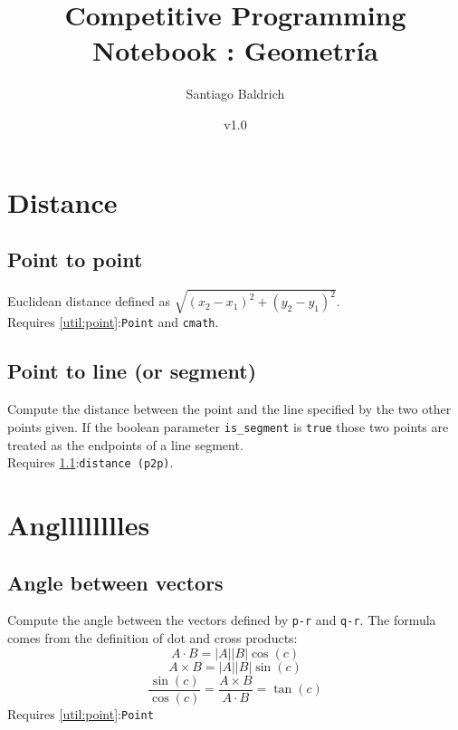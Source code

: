 \documentclass[11pt, oneside]{article}   	%
\title{Competitive Programming Notebook : Geometr\'ia}
\author{Santiago Baldrich}
\date{v1.0}
\begin{document}
\maketitle
\newpage
\tableofcontents






\section{Distance}
\subsection{Point to point}\label{distance:p2p}
	Euclidean distance defined as $\sqrt{(x_2 - x_1)^2 + (y_2 - y_1) ^ 2}$.\\Requires \ref{util:point}:\verb|Point| and \verb|cmath|.
	
\subsection{Point to line (or segment)}\label{distance:p2l}
	Compute the distance between the point and the line specified by the two other points given. If the boolean parameter \verb|is_segment| is \verb|true| those two points are treated as the endpoints of a line segment.\\ Requires \ref{distance:p2p}:\verb|distance (p2p)|.

\section{Anglllllllles}


\subsection{Angle between vectors}\label{angles:angle}
	Compute the angle between the vectors defined by \verb|p-r| and \verb|q-r|. The formula comes from the definition of dot and cross products: \[ A \cdot B = |A||B|\cos(c)\]
				\[ A \times B = |A||B|\sin(c)\] 
				\[\frac{\sin(c)}{\cos(c)} = \frac{A \times B}{A \cdot B}  = \tan(c)\]	
	Requires \ref{util:point}:\verb|Point|
\end{document}
